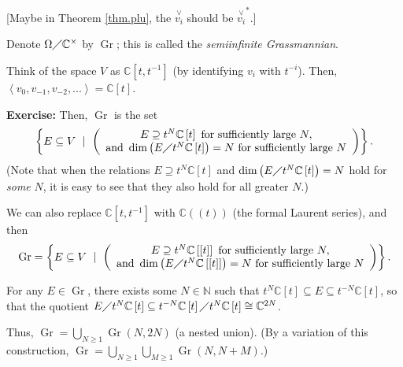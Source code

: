 \documentclass
[numbers=enddot,12pt,final,onecolumn,german,notitlepage]{scrartcl}%
\theoremstyle{definition}
\begin{document}
[Maybe in Theorem \ref{thm.plu}, the $\overset{\vee}{v_{i}}$ should be
$\overset{\vee}{v_{i}}^{\ast}$.]

Denote $\Omega\diagup\mathbb{C}^{\times}$ by $\operatorname*{Gr}$; this is
called the \textit{semiinfinite Grassmannian}.

Think of the space $V$ as $\mathbb{C}\left[  t,t^{-1}\right]  $ (by
identifying $v_{i}$ with $t^{-i}$). Then, $\left\langle v_{0},v_{-1}%
,v_{-2},...\right\rangle =\mathbb{C}\left[  t\right]  $.

\textbf{Exercise:} Then, $\operatorname*{Gr}$ is the set%
\[
\left\{  E\subseteq V\ \mid\ \left(
\begin{array}
[c]{c}%
E\supseteq t^{N}\mathbb{C}\left[  t\right]  \text{ for sufficiently large
}N,\\
\text{and }\dim\left(  E\diagup t^{N}\mathbb{C}\left[  t\right]  \right)
=N\text{ for sufficiently large }N
\end{array}
\right)  \right\}  .
\]
(Note that when the relations $E\supseteq t^{N}\mathbb{C}\left[  t\right]  $
and $\dim\left(  E\diagup t^{N}\mathbb{C}\left[  t\right]  \right)  =N$ hold
for \textit{some} $N$, it is easy to see that they also hold for all greater
$N$.)

We can also replace $\mathbb{C}\left[  t,t^{-1}\right]  $ with $\mathbb{C}%
\left(  \left(  t\right)  \right)  $ (the formal Laurent series), and then
\[
\operatorname*{Gr}=\left\{  E\subseteq V\ \mid\ \left(
\begin{array}
[c]{c}%
E\supseteq t^{N}\mathbb{C}\left[  \left[  t\right]  \right]  \text{ for
sufficiently large }N,\\
\text{and }\dim\left(  E\diagup t^{N}\mathbb{C}\left[  \left[  t\right]
\right]  \right)  =N\text{ for sufficiently large }N
\end{array}
\right)  \right\}  .
\]


For any $E\in\operatorname*{Gr}$, there exists some $N\in\mathbb{N}$ such that
$t^{N}\mathbb{C}\left[  t\right]  \subseteq E\subseteq t^{-N}\mathbb{C}\left[
t\right]  $, so that the quotient $E\diagup t^{N}\mathbb{C}\left[  t\right]
\subseteq t^{-N}\mathbb{C}\left[  t\right]  \diagup t^{N}\mathbb{C}\left[
t\right]  \cong\mathbb{C}^{2N}$.

Thus, $\operatorname*{Gr}=\bigcup\limits_{N\geq1}\operatorname*{Gr}\left(
N,2N\right)  $ (a nested union). (By a variation of this construction,
$\operatorname*{Gr}=\bigcup\limits_{N\geq1}\bigcup\limits_{M\geq
1}\operatorname*{Gr}\left(  N,N+M\right)  $.)
\end{document}
